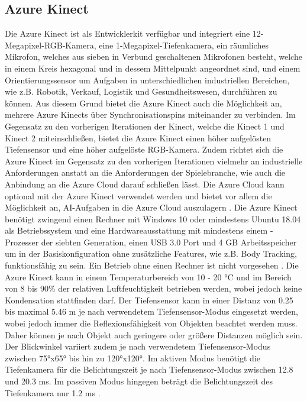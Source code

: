 \subsection{Azure Kinect}
Die Azure Kinect ist als Entwicklerkit verfügbar und integriert eine 12-Megapixel-RGB-Kamera, eine 1-Megapixel-Tiefenkamera, ein räumliches Mikrofon, welches aus sieben in Verbund geschaltenen Mikrofonen besteht, welche in einem Kreis hexagonal und in dessem Mittelpunkt angeordnet sind, und einem Orientierungssensor um Aufgaben in unterschiedlichen industriellen Bereichen, wie z.B. Robotik, Verkauf, Logistik und Gesundheitswesen, durchführen zu können. Aus diesem Grund bietet die Azure Kinect auch die Möglichkeit an, mehrere Azure Kinects über Synchronisationspins miteinander zu verbinden. Im Gegensatz zu den vorherigen Iterationen der Kinect, welche die Kinect 1 und Kinect 2 miteinschließen, bietet die Azure Kinect einen höher aufgelösten Tiefensensor und eine höher aufgelöste RGB-Kamera. Zudem richtet sich die Azure Kinect im Gegensatz zu den vorherigen Iterationen vielmehr an industrielle Anforderungen anstatt an die Anforderungen der Spielebranche, wie auch die Anbindung an die Azure Cloud darauf schließen lässt. Die Azure Cloud kann optional mit der Azure Kinect verwendet werden und bietet vor allem die Möglichkeit an, AI-Aufgaben in die Azure Cloud auszulagern \cite{azure_kinect_2020}. Die Azure Kinect benötigt zwingend einen Rechner mit Windows 10 oder mindestens Ubuntu 18.04 als Betriebssystem und eine Hardwareausstattung mit mindestens einem -Prozesser der siebten Generation, einen USB 3.0 Port und 4 GB Arbeitsspeicher um in der Basiskonfiguration ohne zusätzliche Features, wie z.B. Body Tracking, funktionsfähig zu sein. Ein Betrieb ohne einen Rechner ist nicht vorgesehen \cite{azure_kinect_dk_nodate}. Die Azure Kinect kann in einem Temperaturbereich von 10 - 20 °C und im Bereich von 8 bis 90\% der relativen Luftfeuchtigkeit betrieben werden, wobei jedoch keine Kondensation stattfinden darf. Der Tiefensensor kann in einer Distanz von \num{0,25} bis maximal \num{5,46} m je nach verwendetem Tiefensensor-Modus eingesetzt werden, wobei jedoch immer die Reflexionsfähigkeit von Objekten beachtet werden muss. Daher können je nach Objekt auch geringere oder größere Distanzen möglich sein. Der Blickwinkel variiert zudem je nach verwendetem Tiefensensor-Modus zwischen 75°x65° bis hin zu 120°x120°. Im aktiven Modus benötigt die Tiefenkamera für die Belichtungszeit je nach Tiefensensor-Modus zwischen \num{12,8} und \num{20,3} ms. Im passiven Modus hingegen beträgt die Belichtungszeit des Tiefenkamera nur \num{1,2} ms \cite{tesych_azure_nodate}.


